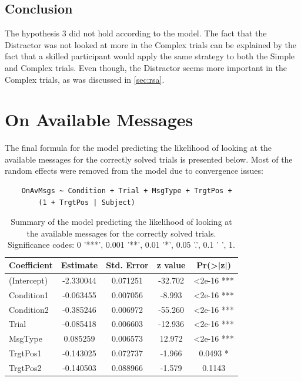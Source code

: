 \subsection*{Conclusion}
\label{sec:ondist_conclusion}
The hypothesis 3 did not hold according to the model. The fact that the Distractor was not looked at more in the Complex trials can be explained by the fact that a skilled participant would apply the same strategy to both the Simple and Complex trials. Even though, the Distractor seems more important in the Complex trials, as was discussed in \autoref{sec:rsa}.














\section{On Available Messages}
\label{sec:available_model}

The final formula for the model predicting the likelihood of looking at the available messages for the correctly solved trials is presented below. Most of the random effects were removed from the model due to convergence issues:
\begin{verbatim}
    OnAvMsgs ~ Condition + Trial + MsgType + TrgtPos +
        (1 + TrgtPos | Subject)
\end{verbatim}

\begin{table}[h!]
\centering
\begin{tabular}{|l|c|c|c|c|}
\hline
\textbf{Coefficient} & \textbf{Estimate} & \textbf{Std. Error} & \textbf{z value} & \textbf{Pr(>|z|)} \\ \hline
(Intercept)          & -2.330044         & 0.071251            & -32.702          & <2e-16 ***        \\ \hline
Condition1           & -0.063455         & 0.007056            & -8.993           & <2e-16 ***        \\ \hline
Condition2           & -0.385246         & 0.006972            & -55.260          & <2e-16 ***        \\ \hline
Trial                & -0.085418         & 0.006603            & -12.936          & <2e-16 ***        \\ \hline
MsgType             & 0.085259          & 0.006573            & 12.972           & <2e-16 ***        \\ \hline
TrgtPos1             & -0.143025         & 0.072737            & -1.966           & 0.0493 *          \\ \hline
TrgtPos2             & -0.140503         & 0.088966            & -1.579           & 0.1143            \\ \hline
\end{tabular}
\caption{Summary of the model predicting the likelihood of looking at the available messages for the correctly solved trials. Significance codes: 0 '***', 0.001 '**', 0.01 '*', 0.05 '.', 0.1 ' ', 1.}
\label{tab:model_coefficients_available}
\end{table}


